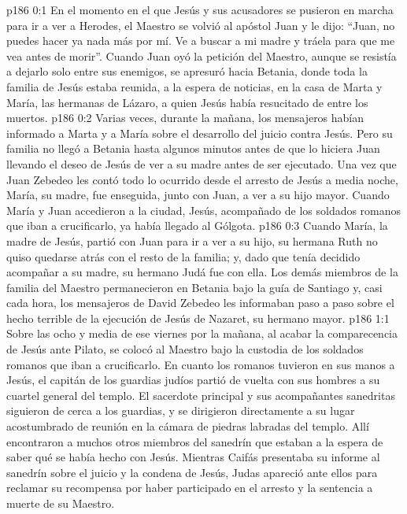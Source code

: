 \author{Comisión de seres intermedios}
\vs p186 0:1 En el momento en el que Jesús y sus acusadores se pusieron en marcha para ir a ver a Herodes, el Maestro se volvió al apóstol Juan y le dijo: “Juan, no puedes hacer ya nada más por mí. Ve a buscar a mi madre y tráela para que me vea antes de morir”. Cuando Juan oyó la petición del Maestro, aunque se resistía a dejarlo solo entre sus enemigos, se apresuró hacia Betania, donde toda la familia de Jesús estaba reunida, a la espera de noticias, en la casa de Marta y María, las hermanas de Lázaro, a quien Jesús había resucitado de entre los muertos.
\vs p186 0:2 Varias veces, durante la mañana, los mensajeros habían informado a Marta y a María sobre el desarrollo del juicio contra Jesús. Pero su familia no llegó a Betania hasta algunos minutos antes de que lo hiciera Juan llevando el deseo de Jesús de ver a su madre antes de ser ejecutado. Una vez que Juan Zebedeo les contó todo lo ocurrido desde el arresto de Jesús a media noche, María, su madre, fue enseguida, junto con Juan, a ver a su hijo mayor. Cuando María y Juan accedieron a la ciudad, Jesús, acompañado de los soldados romanos que iban a crucificarlo, ya había llegado al Gólgota.
\vs p186 0:3 Cuando María, la madre de Jesús, partió con Juan para ir a ver a su hijo, su hermana Ruth no quiso quedarse atrás con el resto de la familia; y, dado que tenía decidido acompañar a su madre, su hermano Judá fue con ella. Los demás miembros de la familia del Maestro permanecieron en Betania bajo la guía de Santiago y, casi cada hora, los mensajeros de David Zebedeo les informaban paso a paso sobre el hecho terrible de la ejecución de Jesús de Nazaret, su hermano mayor.
\vs p186 1:1 Sobre las ocho y media de ese viernes por la mañana, al acabar la comparecencia de Jesús ante Pilato, se colocó al Maestro bajo la custodia de los soldados romanos que iban a crucificarlo. En cuanto los romanos tuvieron en sus manos a Jesús, el capitán de los guardias judíos partió de vuelta con sus hombres a su cuartel general del templo. El sacerdote principal y sus acompañantes sanedritas siguieron de cerca a los guardias, y se dirigieron directamente a su lugar acostumbrado de reunión en la cámara de piedras labradas del templo. Allí encontraron a muchos otros miembros del sanedrín que estaban a la espera de saber qué se había hecho con Jesús. Mientras Caifás presentaba su informe al sanedrín sobre el juicio y la condena de Jesús, Judas apareció ante ellos para reclamar su recompensa por haber participado en el arresto y la sentencia a muerte de su Maestro.
